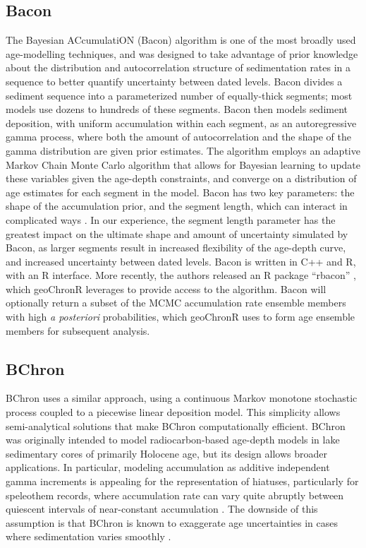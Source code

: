 \documentclass[gchron, manuscript]{copernicus}
\begin{document}
\subsection{Bacon}

The Bayesian ACcumulatiON (Bacon) algorithm \citep{Blaauw2011BACON} is
one of the most broadly used age-modelling techniques, and was designed
to take advantage of prior knowledge about the distribution and
autocorrelation structure of sedimentation rates in a sequence to better
quantify uncertainty between dated levels. Bacon divides a sediment
sequence into a parameterized number of equally-thick segments; most
models use dozens to hundreds of these segments. Bacon then models
sediment deposition, with uniform accumulation within each segment, as
an autoregressive gamma process, where both the amount of
autocorrelation and the shape of the gamma distribution are given prior
estimates. The algorithm employs an adaptive Markov Chain Monte Carlo
algorithm that allows for Bayesian learning to update these variables
given the age-depth constraints, and converge on a distribution of age
estimates for each segment in the model. Bacon has two key parameters:
the shape of the accumulation prior, and the segment length, which can
interact in complicated ways \citep{trachsel2017}. In our experience,
the segment length parameter has the greatest impact on the ultimate
shape and amount of uncertainty simulated by Bacon, as larger segments
result in increased flexibility of the age-depth curve, and increased
uncertainty between dated levels. Bacon is written in C++ and R, with an
R interface. More recently, the authors released an R package ``rbacon''
\citep{baconPackage}, which geoChronR leverages to provide access to the
algorithm. Bacon will optionally return a subset of the MCMC
accumulation rate ensemble members with high \emph{a posteriori}
probabilities, which geoChronR uses to form age ensemble members for
subsequent analysis.

\subsection{BChron}

BChron \citep{bchron, parnell2008flexible} uses a similar approach,
using a continuous Markov monotone stochastic process coupled to a
piecewise linear deposition model. This simplicity allows
semi-analytical solutions that make BChron computationally efficient.
BChron was originally intended to model radiocarbon-based age-depth
models in lake sedimentary cores of primarily Holocene age, but its
design allows broader applications. In particular, modeling accumulation
as additive independent gamma increments is appealing for the
representation of hiatuses, particularly for speleothem records, where
accumulation rate can vary quite abruptly between quiescent intervals of
near-constant accumulation \citep{Parnell_QSR2011, PRYSM, Hu_epsl17}.
The downside of this assumption is that BChron is known to exaggerate
age uncertainties in cases where sedimentation varies smoothly
\citep{trachsel2017}.
\end{document}
